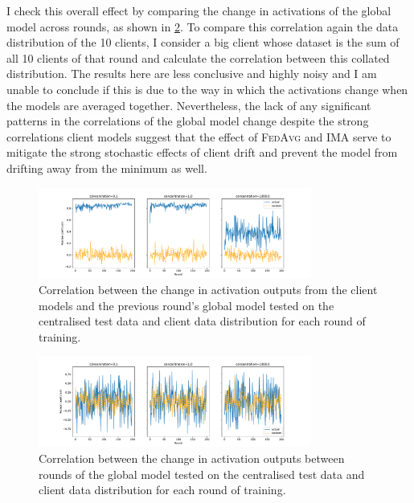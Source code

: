 \documentclass{article}
\newcommand*{\fedavg}{\textsc{FedAvg}}
\begin{document}
I check this overall effect by comparing the change in activations of the global model across rounds, as shown in \cref{fig:change_test_global}. To compare this correlation again the data distribution of the 10 clients, I consider a big client whose dataset is the sum of all 10 clients of that round and calculate the correlation between this collated distribution. The results here are less conclusive and highly noisy and I am unable to conclude if this is due to the way in which the activations change when the models are averaged together. Nevertheless, the lack of any significant patterns in the correlations of the global model change despite the strong correlations client models suggest that the effect of \fedavg{} and IMA serve to mitigate the strong stochastic effects of client drift and prevent the model from drifting away from the minimum as well.


\begin{figure}
  \centering
  \includegraphics[width=0.8\textwidth]{images/change_prev_client_pearson_vs_rounds.pdf}
  \caption{Correlation between the change in activation outputs from the client models and the previous round's global model tested on the centralised test data and client data distribution for each round of training.}
  \label{fig:change_test_client}
\end{figure}


\begin{figure}
  \centering
  \includegraphics[width=0.8\textwidth]{images/change_prev_global_pearson_vs_rounds.pdf}
  \caption{Correlation between the change in activation outputs between rounds of the global model tested on the centralised test data and client data distribution for each round of training.}
  \label{fig:change_test_global}
\end{figure}
\end{document}
